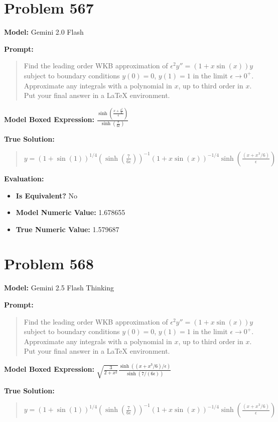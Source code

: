 \documentclass{article}
\begin{document}
\section*{Problem 567}
\textbf{Model:} Gemini 2.0 Flash

\textbf{Prompt:}
\begin{quote}
Find the leading order WKB approximation of $\epsilon^2 y'' = (1 + x \sin(x)) y$ subject to boundary conditions $y(0) = 0$, $y(1)= 1$ in the limit $\epsilon \rightarrow 0^+$. Approximate any integrals with a polynomial in $x$, up to third order in $x$. Put your final answer in a LaTeX \boxed{} environment.
\end{quote}
\textbf{Model Boxed Expression:} $\frac{\sinh\left(\frac{x + \frac{x^3}{6}}{\epsilon}\right)}{\sinh\left(\frac{7}{6\epsilon}\right)}$

\textbf{True Solution:}
\begin{quote}
$y = (1 + \sin(1))^{1/4} \left(\sinh\left(\frac{7}{6\epsilon}\right)\right)^{-1}(1 + x\sin(x))^{-1/4} \sinh\left(\frac{(x + x^3/6)}{\epsilon}\right)$
\end{quote}

\textbf{Evaluation:}
\begin{itemize}
\item \textbf{Is Equivalent?} No
\item \textbf{Model Numeric Value:} 1.678655
\item \textbf{True Numeric Value:} 1.579687
\end{itemize}
\vspace{1cm}
\section*{Problem 568}
\textbf{Model:} Gemini 2.5 Flash Thinking

\textbf{Prompt:}
\begin{quote}
Find the leading order WKB approximation of $\epsilon^2 y'' = (1 + x \sin(x)) y$ subject to boundary conditions $y(0) = 0$, $y(1)= 1$ in the limit $\epsilon \rightarrow 0^+$. Approximate any integrals with a polynomial in $x$, up to third order in $x$. Put your final answer in a LaTeX \boxed{} environment.
\end{quote}
\textbf{Model Boxed Expression:} $\sqrt{\frac{3}{2+x^2}} \frac{\sinh((x+x^3/6)/\epsilon)}{\sinh(7/(6\epsilon))}$

\textbf{True Solution:}
\begin{quote}
$y = (1 + \sin(1))^{1/4} \left(\sinh\left(\frac{7}{6\epsilon}\right)\right)^{-1}(1 + x\sin(x))^{-1/4} \sinh\left(\frac{(x + x^3/6)}{\epsilon}\right)$
\end{quote}
\end{document}
